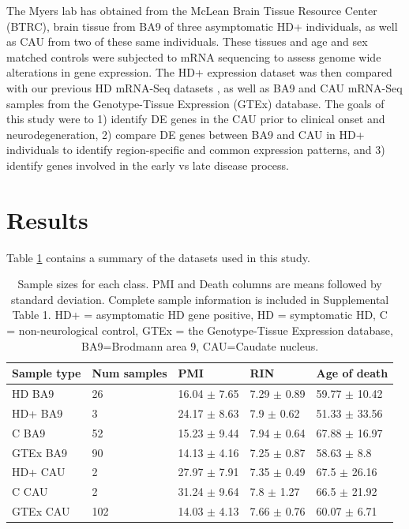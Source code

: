 \documentclass[fleqn,10pt,table]{wlscirep}
\begin{document}
The Myers lab has obtained from the McLean Brain Tissue Resource Center (BTRC), brain tissue from BA9 of three asymptomatic HD+ individuals, as well as CAU from two of these same individuals.
These tissues and age and sex matched controls were subjected to mRNA sequencing to assess genome wide alterations in gene expression.
The HD+ expression dataset was then compared with our previous HD mRNA-Seq datasets \cite{Labadorf2017-qb}, as well as BA9 and CAU mRNA-Seq samples from the Genotype-Tissue Expression (GTEx) database.
The goals of this study were to 1) identify DE genes in the CAU prior to clinical onset and neurodegeneration, 2) compare DE genes between BA9 and CAU in HD+ individuals to identify region-specific and common expression patterns, and 3) identify genes involved in the early vs late disease process.

\section{Results}

Table \ref{tab:samples} contains a summary of the datasets used in this study.

\begin{table}[ht]
\centering
{}
\begin{tabular}{|l|l|l|l|l|} \hline
Sample type & Num samples & PMI & RIN & Age of death \\ \hline
HD BA9 & 26 & 16.04 $\pm$ 7.65 & 7.29 $\pm$ 0.89 & 59.77 $\pm$ 10.42 \\ \hline
HD+ BA9 & 3 & 24.17 $\pm$ 8.63 & 7.9 $\pm$ 0.62 & 51.33 $\pm$ 33.56 \\ \hline
C BA9 & 52 & 15.23 $\pm$ 9.44 & 7.94 $\pm$ 0.64 & 67.88 $\pm$ 16.97 \\ \hline
GTEx BA9 & 90 & 14.13 $\pm$ 4.16 & 7.25 $\pm$ 0.87 & 58.63 $\pm$ 8.8 \\ \hline
HD+ CAU & 2 & 27.97 $\pm$ 7.91 & 7.35 $\pm$ 0.49 & 67.5 $\pm$ 26.16 \\ \hline
C CAU & 2 & 31.24 $\pm$ 9.64 & 7.8 $\pm$ 1.27 & 66.5 $\pm$ 21.92 \\ \hline
GTEx CAU & 102 & 14.03 $\pm$ 4.13 & 7.66 $\pm$ 0.76 & 60.07 $\pm$ 6.71 \\ \hline
\end{tabular}
\caption{Sample sizes for each class.
PMI and Death columns are means followed by standard deviation.
Complete sample information is included in Supplemental Table 1.
HD+ = asymptomatic HD gene positive, HD = symptomatic HD, C = non-neurological control, GTEx = the Genotype-Tissue Expression database, BA9=Brodmann area 9, CAU=Caudate nucleus.
\label{tab:samples}}
\end{table}
\end{document}
